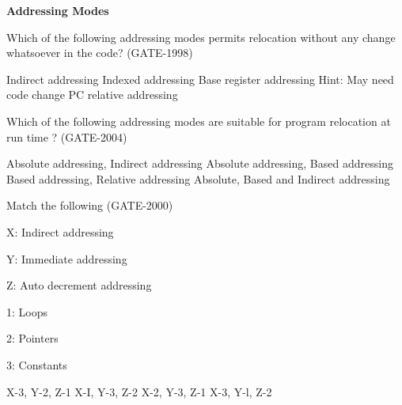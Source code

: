 
\centerline{\textbf{ \LARGE Addressing Modes}}


\begin{questyle}
  \question  Which of the following addressing modes permits relocation without any
             change whatsoever in the code?  (GATE-1998)

  \begin{choices}
    \choice         Indirect addressing
    \choice         Indexed addressing
    \choice         Base register addressing \qquad Hint: May need code change
    \CorrectChoice  PC relative addressing
  \end{choices}
\end{questyle}

\begin{questyle}
  \question  Which of the following addressing modes are suitable for program relocation at run time ?  (GATE-2004)

  \begin{choices}
    \choice         Absolute addressing, Indirect addressing
    \choice         Absolute addressing, Based addressing
    \CorrectChoice  Based addressing, Relative addressing
    \choice         Absolute, Based and Indirect addressing
  \end{choices}
\end{questyle}

\begin{questyle}
  \question  Match the following  (GATE-2000)

  \begin{multiColList}[2]
    \item[X:] Indirect addressing
    \item[Y:] Immediate addressing
    \item[Z:] Auto decrement addressing
    \item[1:] Loops
    \item[2:] Pointers
    \item[3:] Constants
  \end{multiColList}

  \begin{oneparchoices}
    \choice         X-3, Y-2, Z-1
    \choice         X-I, Y-3, Z-2
    \CorrectChoice  X-2, Y-3, Z-1
    \choice         X-3, Y-l, Z-2
  \end{oneparchoices}
\end{questyle}


